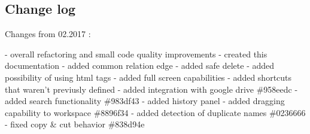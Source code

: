 \documentclass{article}
\begin{document}
\subsection{Change log}

Changes from 02.2017 :

- overall refactoring and small code quality improvements
- created this documentation
- added common relation edge
- added safe delete
- added possibility of using html tags
- added full screen capabilities
- added shortcuts that waren't previusly defined
- added integration with google drive                        \#958eedc
- added search functionality                                 \#983df43
- added history panel
- added dragging capability to workspace                     \#8896f34
- added detection of duplicate names                         \#0236666
- fixed copy & cut behavior                                  \#838d94e
\end{document}
